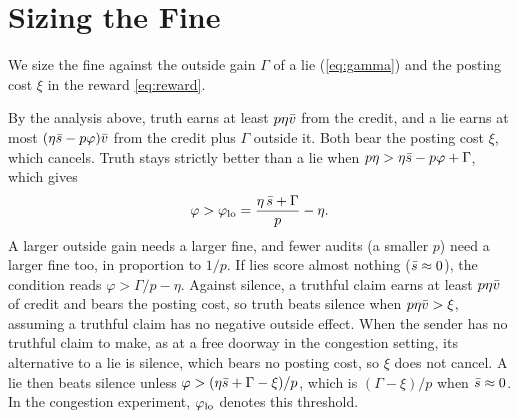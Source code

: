 \section{Sizing the Fine}
\label{app:fine}


We size the fine against the outside gain $\Gamma$ of a lie (\cref{eq:gamma}) and the posting cost $\xi$ in the reward \cref{eq:reward}.

By the analysis above, truth earns at least $p\eta\bar v$ from the credit, and a lie earns at most $(\eta\bar s-p\varphi)\bar v$ from the credit plus $\Gamma$ outside it. Both bear the posting cost $\xi$, which cancels. Truth stays strictly better than a lie when $p\eta>\eta\bar s-p\varphi+\Gamma$, which gives
\begin{equation}
  \varphi>\varphi_{\mathrm{lo}} = \frac{\eta\,\bar s+\Gamma}{p}-\eta .
  \label{eq:fine}
\end{equation}
A larger outside gain needs a larger fine, and fewer audits (a smaller $p$) need a larger fine too, in proportion to $1/p$. If lies score almost nothing ($\bar s\approx0$), the condition reads $\varphi>\Gamma/p-\eta$. Against silence, a truthful claim earns at least $p\eta\bar v$ of credit and bears the posting cost, so truth beats silence when $p\eta\bar v>\xi$, assuming a truthful claim has no negative outside effect. When the sender has no truthful claim to make, as at a free doorway in the congestion setting, its alternative to a lie is silence, which bears no posting cost, so $\xi$ does not cancel. A lie then beats silence unless $\varphi>(\eta\bar s+\Gamma-\xi)/p$, which is $(\Gamma-\xi)/p$ when $\bar s\approx0$. In the congestion experiment, $\varphi_{\mathrm{lo}}$ denotes this threshold.




